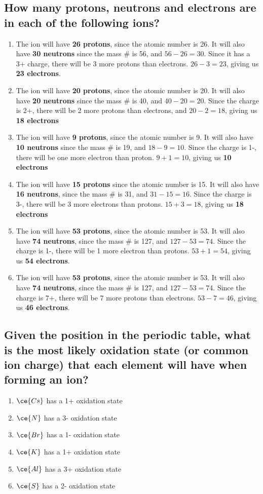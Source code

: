 \documentclass{scrartcl}
\begin{document}
\subsection{How many protons, neutrons and electrons are in each of the following ions?}
\label{sec:org4c6f44d}
\begin{enumerate}
\item The ion will have \textbf{26 protons}, since the atomic number is 26. It will also have \textbf{30 neutrons} since the mass \# is 56, and \(56-26=30\). Since it has a 3+ charge, there will be 3 more protons than electrons. \(26-3=23\), giving us \textbf{23 electrons}.
\item The ion will have \textbf{20 protons}, since the atomic number is 20. It will also have \textbf{20 neutrons} since the mass \# is 40, and \(40-20 = 20\). Since the charge is 2+, there will be 2 more protons than electrons, and \(20-2=18\), giving us \textbf{18 electrons}
\item The ion will have \textbf{9 protons}, since the atomic number is 9. It will also have \textbf{10 neutrons} since the mass \# is 19, and \(18-9=10\). Since the charge is 1-, there will be one more electron than proton. \(9+1=10\), giving us \textbf{10 electrons}
\item The ion will have \textbf{15 protons} since the atomic number is 15. It will also have \textbf{16 neutrons}, since the mass \# is 31, and \(31-15=16\). Since the charge is 3-, there will be 3 more electrons than protons. \(15+3=18\), giving us \textbf{18 electrons}
\item The ion will have \textbf{53 protons}, since the atomic number is 53. It will also have \textbf{74 neutrons}, since the mass \# is 127, and \(127-53=74\). Since the charge is 1-, there will be 1 more electron than protons. \(53+1=54\), giving us \textbf{54 electrons}.
\item The ion will have \textbf{53 protons}, since the atomic number is 53. It will also have \textbf{74 neutrons}, since the mass \# is 127, and \(127-53=74\). Since the charge is 7+, there will be 7 more protons than electrons. \(53-7=46\), giving us \textbf{46 electrons}.
\end{enumerate}

\subsection{Given the position in the periodic table, what is the most likely oxidation state (or common ion charge) that each element will have when forming an ion?}
\label{sec:org298c5d1}
\begin{enumerate}
\item \(\ce{Cs}\) has a 1+ oxidation state
\item \(\ce{N}\) has a 3- oxidation state
\item \(\ce{Br}\) has a 1- oxidation state
\item \(\ce{K}\) has a 1+ oxidation state
\item \(\ce{Al}\) has a 3+ oxidation state
\item \(\ce{S}\) has a 2- oxidation state
\end{enumerate}
\end{document}
